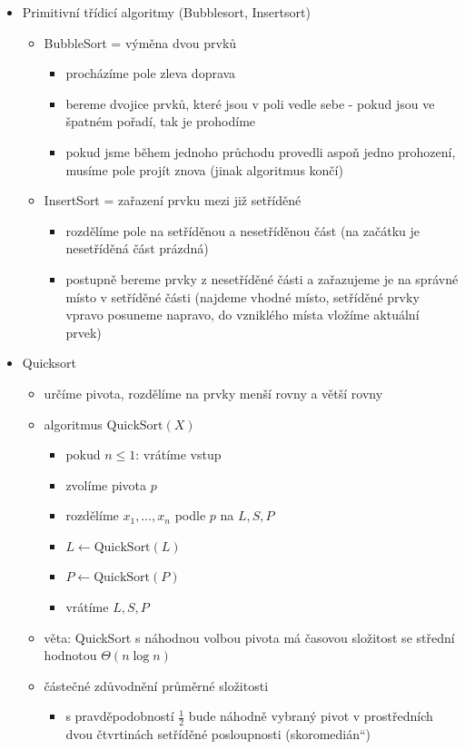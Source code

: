 \begin{itemize}
\begin{itemize}
\end{itemize}
\item Primitivní třídicí algoritmy (Bubblesort, Insertsort)
\begin{itemize}
\item BubbleSort = výměna dvou prvků
\begin{itemize}
\item procházíme pole zleva doprava
\item bereme dvojice prvků, které jsou v poli vedle sebe - pokud jsou ve špatném pořadí, tak je prohodíme
\item pokud jsme během jednoho průchodu provedli aspoň jedno prohození, musíme pole projít znova (jinak algoritmus končí)
\end{itemize}
\item InsertSort = zařazení prvku mezi již setříděné
\begin{itemize}
\item rozdělíme pole na setříděnou a nesetříděnou část (na začátku je nesetříděná část prázdná)
\item postupně bereme prvky z nesetříděné části a zařazujeme je na správné místo v setříděné části (najdeme vhodné místo, setříděné prvky vpravo posuneme napravo, do vzniklého místa vložíme aktuální prvek)
\end{itemize}
\end{itemize}
\item Quicksort
\begin{itemize}
\item určíme pivota, rozdělíme na prvky menší rovny a větší rovny
\item algoritmus $\mathrm{QuickSort}(X)$
\begin{itemize}
\item pokud $n\leq 1$: vrátíme vstup
\item zvolíme pivota $p$
\item rozdělíme $x_1,\dots,x_n$ podle $p$ na $L,S,P$
\item $L\leftarrow \text{QuickSort}(L)$
\item $P\leftarrow \text{QuickSort}(P)$
\item vrátíme $L,S,P$
\end{itemize}
\item věta: QuickSort s náhodnou volbou pivota má časovou složitost se střední hodnotou $\Theta(n\log n)$
\item částečné zdůvodnění průměrné složitosti
\begin{itemize}
\item s pravděpodobností $\frac12$ bude náhodně vybraný pivot v prostředních dvou čtvrtinách setříděné posloupnosti (\quotedblbase{}skoromedián\textquotedblleft{})

\end{itemize}
\end{itemize}
\end{itemize}
